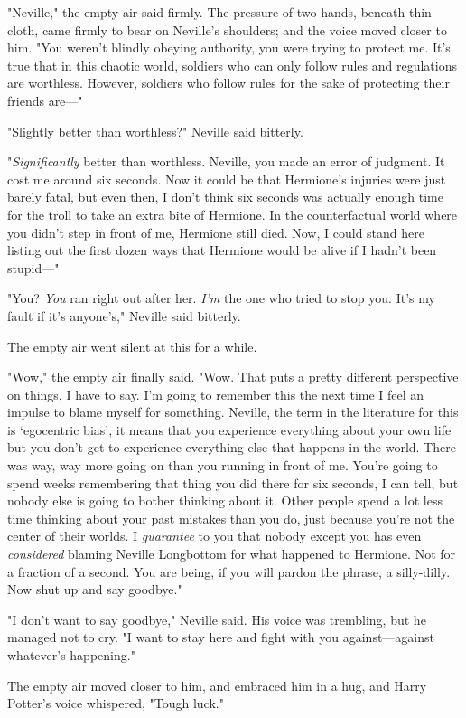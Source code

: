 "Neville," the empty air said firmly. The pressure of two hands, beneath thin 
cloth, came firmly to bear on Neville's shoulders; and the voice moved closer 
to him. "You weren't blindly obeying authority, you were trying to protect me. 
It's true that in this chaotic world, soldiers who can only follow rules and 
regulations are worthless. However, soldiers who follow rules for the sake of 
protecting their friends are---"

"Slightly better than worthless?" Neville said bitterly.

"\emph{Significantly} better than worthless. Neville, you made an error of 
judgment. It cost me around six seconds. Now it could be that Hermione's 
injuries were just barely fatal, but even then, I don't think six seconds was 
actually enough time for the troll to take an extra bite of Hermione. In the 
counterfactual world where you didn't step in front of me, Hermione still died. 
Now, I could stand here listing out the first dozen ways that Hermione would be 
alive if I hadn't been stupid---"

"You? \emph{You} ran right out after her. \emph{I'm} the one who tried to stop 
you. It's my fault if it's anyone's," Neville said bitterly.

The empty air went silent at this for a while.

"Wow," the empty air finally said. "Wow. That puts a pretty different 
perspective on things, I have to say. I'm going to remember this the next time 
I feel an impulse to blame myself for something. Neville, the term in the 
literature for this is `egocentric bias', it means that you experience 
everything about your own life but you don't get to experience everything else 
that happens in the world. There was way, way more going on than you running in 
front of me. You're going to spend weeks remembering that thing you did there 
for six seconds, I can tell, but nobody else is going to bother thinking about 
it. Other people spend a lot less time thinking about your past mistakes than 
you do, just because you're not the center of their worlds. I \emph{guarantee} 
to you that nobody except you has even \emph{considered} blaming Neville 
Longbottom for what happened to Hermione. Not for a fraction of a second. You 
are being, if you will pardon the phrase, a silly-dilly. Now shut up and say 
goodbye."

"I don't want to say goodbye," Neville said. His voice was trembling, but he 
managed not to cry. "I want to stay here and fight with you against---against 
whatever's happening."

The empty air moved closer to him, and embraced him in a hug, and Harry 
Potter's voice whispered, "Tough luck."
